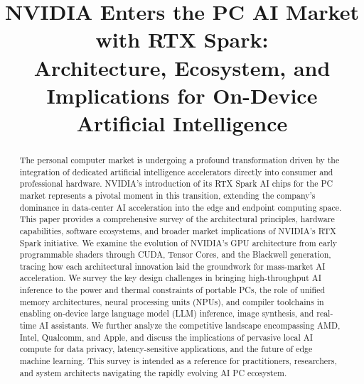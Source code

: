 \documentclass[conference]{IEEEtran}
\begin{document}
\title{NVIDIA Enters the PC AI Market with RTX Spark:\\Architecture, Ecosystem, and Implications for On-Device Artificial Intelligence}

\author{
\and
{}
}

\maketitle

\begin{abstract}
The personal computer market is undergoing a profound transformation driven by the integration of dedicated artificial intelligence accelerators directly into consumer and professional hardware. NVIDIA's introduction of its RTX Spark AI chips for the PC market represents a pivotal moment in this transition, extending the company's dominance in data-center AI acceleration into the edge and endpoint computing space. This paper provides a comprehensive survey of the architectural principles, hardware capabilities, software ecosystems, and broader market implications of NVIDIA's RTX Spark initiative. We examine the evolution of NVIDIA's GPU architecture from early programmable shaders through CUDA, Tensor Cores, and the Blackwell generation, tracing how each architectural innovation laid the groundwork for mass-market AI acceleration. We survey the key design challenges in bringing high-throughput AI inference to the power and thermal constraints of portable PCs, the role of unified memory architectures, neural processing units (NPUs), and compiler toolchains in enabling on-device large language model (LLM) inference, image synthesis, and real-time AI assistants. We further analyze the competitive landscape encompassing AMD, Intel, Qualcomm, and Apple, and discuss the implications of pervasive local AI compute for data privacy, latency-sensitive applications, and the future of edge machine learning. This survey is intended as a reference for practitioners, researchers, and system architects navigating the rapidly evolving AI PC ecosystem.
\end{abstract}
\end{document}
